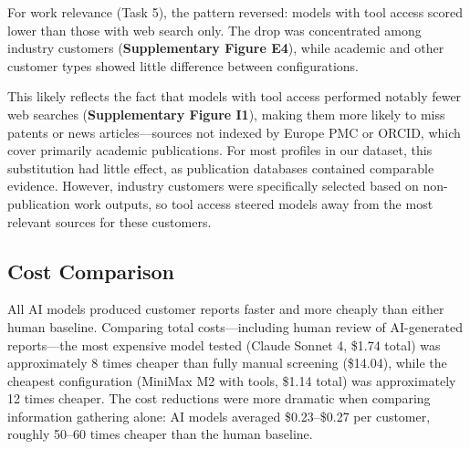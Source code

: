 \documentclass[utf8]{FrontiersinHarvard}
\begin{document}
For work relevance (Task 5), the pattern reversed: models with tool access scored lower than those with web search only. The drop was concentrated among industry customers (\textbf{Supplementary Figure E4}), while academic and other customer types showed little difference between configurations.

This likely reflects the fact that models with tool access performed notably fewer web searches (\textbf{Supplementary Figure I1}), making them more likely to miss patents or news articles---sources not indexed by Europe PMC or ORCID, which cover primarily academic publications. For most profiles in our dataset, this substitution had little effect, as publication databases contained comparable evidence. However, industry customers were specifically selected based on non-publication work outputs, so tool access steered models away from the most relevant sources for these customers.

\subsection{Cost Comparison}

All AI models produced customer reports faster and more cheaply than either human baseline. Comparing total costs---including human review of AI-generated reports---the most expensive model tested (Claude Sonnet 4, \$1.74 total) was approximately 8 times cheaper than fully manual screening (\$14.04), while the cheapest configuration (MiniMax M2 with tools, \$1.14 total) was approximately 12 times cheaper. The cost reductions were more dramatic when comparing information gathering alone: AI models averaged \$0.23--\$0.27 per customer, roughly 50--60 times cheaper than the human baseline.
\end{document}
